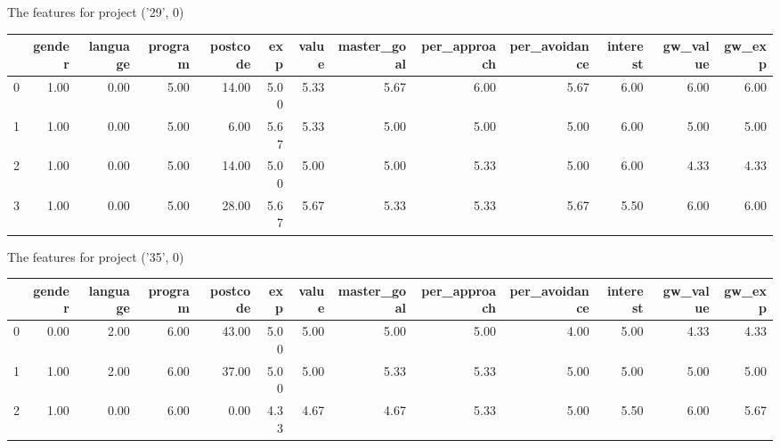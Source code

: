 \documentclass[7pt]{article}
\begin{document}
\begin{landscape}
The features for project ('29', 0)\newline
\begin{tabular}{lrrrrrrrrrrrr}
\toprule
{} &  gender &  language &  program &  postcode &  exp &  value &  master\_goal &  per\_approach &  per\_avoidance &  interest &  gw\_value &  gw\_exp \\
\midrule
0 &    1.00 &      0.00 &     5.00 &     14.00 & 5.00 &   5.33 &         5.67 &          6.00 &           5.67 &      6.00 &             6.00 &           6.00 \\
1 &    1.00 &      0.00 &     5.00 &      6.00 & 5.67 &   5.33 &         5.00 &          5.00 &           5.00 &      6.00 &             5.00 &           5.00 \\
2 &    1.00 &      0.00 &     5.00 &     14.00 & 5.00 &   5.00 &         5.00 &          5.33 &           5.00 &      6.00 &             4.33 &           4.33 \\
3 &    1.00 &      0.00 &     5.00 &     28.00 & 5.67 &   5.67 &         5.33 &          5.33 &           5.67 &      5.50 &             6.00 &           6.00 \\
\bottomrule
\end{tabular}

The features for project ('35', 0)\newline
\begin{tabular}{lrrrrrrrrrrrr}
\toprule
{} &  gender &  language &  program &  postcode &  exp &  value &  master\_goal &  per\_approach &  per\_avoidance &  interest &  gw\_value &  gw\_exp \\
\midrule
0 &    0.00 &      2.00 &     6.00 &     43.00 & 5.00 &   5.00 &         5.00 &          5.00 &           4.00 &      5.00 &             4.33 &           4.33 \\
1 &    1.00 &      2.00 &     6.00 &     37.00 & 5.00 &   5.00 &         5.33 &          5.33 &           5.00 &      5.00 &             5.00 &           5.00 \\
2 &    1.00 &      0.00 &     6.00 &      0.00 & 4.33 &   4.67 &         4.67 &          5.33 &           5.00 &      5.50 &             6.00 &           5.67 \\
\bottomrule
\end{tabular}


\end{landscape}
\end{document}

